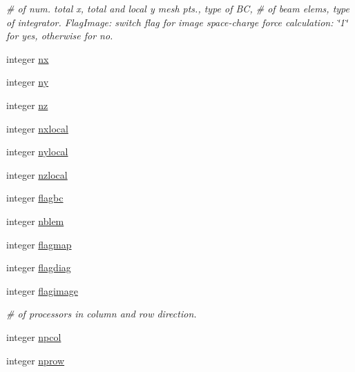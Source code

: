 \textbf{ }\par
{\em \# of num. total x, total and local y mesh pts., type of BC, \# of beam elems, type of integrator. Flag\+Image\+: switch flag for image space-\/charge force calculation\+: \char`\"{}1\char`\"{} for yes, otherwise for no. }\begin{DoxyCompactItemize}
\item 
integer \mbox{\hyperlink{namespaceaccsimulatorclass_af171a5a02a33455149f10b7d37b8bb05}{nx}}
\item 
integer \mbox{\hyperlink{namespaceaccsimulatorclass_a613bfb8a3a6c3b3c9b27ffb5e3212dc4}{ny}}
\item 
integer \mbox{\hyperlink{namespaceaccsimulatorclass_a04ca8b747bd54d4a8505a69955862aa0}{nz}}
\item 
integer \mbox{\hyperlink{namespaceaccsimulatorclass_a5dc8a50cfd7cf88480c61957bd2d3cf5}{nxlocal}}
\item 
integer \mbox{\hyperlink{namespaceaccsimulatorclass_a9c87c4ee52e3d4016c11d91c112a7c9d}{nylocal}}
\item 
integer \mbox{\hyperlink{namespaceaccsimulatorclass_ae3de189d9f5d65ff6f9b9ff2b9e05772}{nzlocal}}
\item 
integer \mbox{\hyperlink{namespaceaccsimulatorclass_a70f0ebae12dbcf56dec3c7ae6f8886c2}{flagbc}}
\item 
integer \mbox{\hyperlink{namespaceaccsimulatorclass_a37780aaa58fe89db4f7a2e3c42103e00}{nblem}}
\item 
integer \mbox{\hyperlink{namespaceaccsimulatorclass_a65cb81fb31ef5060caa131ca8c257191}{flagmap}}
\item 
integer \mbox{\hyperlink{namespaceaccsimulatorclass_a7521d1a707056c51ad6944c43d87ee60}{flagdiag}}
\item 
integer \mbox{\hyperlink{namespaceaccsimulatorclass_a0d66f013e8f3cf857e0e569219214394}{flagimage}}
\end{DoxyCompactItemize}

\textbf{ }\par
{\em \# of processors in column and row direction. }\begin{DoxyCompactItemize}
\item 
integer \mbox{\hyperlink{namespaceaccsimulatorclass_a77fcd367f3c92fef3f1262ddad064210}{npcol}}
\item 
integer \mbox{\hyperlink{namespaceaccsimulatorclass_a49bf0e9e019ba55c31f615832b52fad5}{nprow}}
\end{DoxyCompactItemize}

